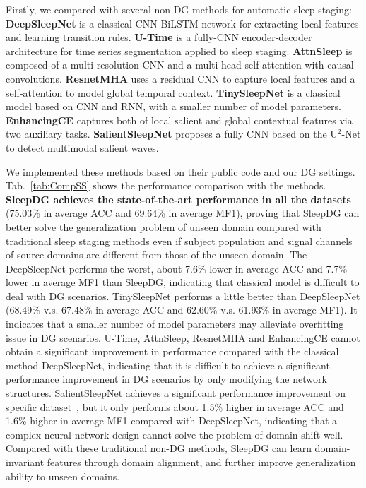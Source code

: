 \documentclass[letterpaper]{article} %
\begin{document}
	Firstly, we compared with several non-DG methods for automatic sleep staging:
	\textbf{DeepSleepNet} \citep{Supratak2017DeepSleepNetAM} is a classical CNN-BiLSTM network for extracting local features and learning transition rules.
	\textbf{U-Time} \citep{Perslev2019UTimeAF} is
	a fully-CNN encoder-decoder architecture for time series segmentation applied to sleep staging.
	\textbf{AttnSleep} \citep{Eldele2021AnAD}
	is composed of a multi-resolution CNN  and a multi-head self-attention with causal convolutions.
	\textbf{ResnetMHA} \citep{Qu2020ARB}
	uses a residual CNN to capture local features and a self-attention to model global temporal context.
	\textbf{TinySleepNet} \citep{Supratak2020TinySleepNetAE}
	is a classical model based on CNN and RNN, with a smaller number of model parameters.
	\textbf{EnhancingCE} \citep{Phyo2022EnhancingCE}
	captures both of local salient and global contextual features via two auxiliary tasks.
	\textbf{SalientSleepNet} \citep{Jia2021SalientSleepNetMS}
	proposes a fully CNN based on the U$^2$-Net to detect multimodal salient waves.
	
	We implemented these methods based on their public code and our DG settings.
	Tab.~\ref{tab:CompSS} shows the performance comparison with the methods.
	\textbf{SleepDG achieves the state-of-the-art performance in all the datasets} (75.03\% in average ACC and 69.64\% in average MF1), proving that SleepDG can better solve the generalization problem of unseen domain compared with traditional sleep staging methods even if subject population and signal channels of source domains are different from those of the unseen domain.
	The DeepSleepNet performs the worst, about 7.6\% lower in average ACC and 7.7\% lower in average MF1 than SleepDG, indicating that classical model is difficult to deal with DG scenarios.
	TinySleepNet performs a little better than DeepSleepNet (68.49\% v.s. 67.48\% in average ACC and 62.60\% v.s. 61.93\% in average MF1).
	It indicates that a smaller number of model parameters may alleviate overfitting issue in DG scenarios.
	U-Time, AttnSleep, ResnetMHA and EnhancingCE cannot obtain a significant improvement in performance compared with the classical method DeepSleepNet, indicating that it is difficult to achieve a significant performance improvement in DG scenarios by only modifying the network structures.
	SalientSleepNet achieves a significant performance improvement on specific dataset~\citep{Jia2021SalientSleepNetMS}, but it only performs about 1.5\% higher in average ACC and 1.6\% higher in average MF1 compared with DeepSleepNet, indicating that a complex neural network design cannot solve the problem of domain shift well.
	Compared with these traditional non-DG methods, SleepDG can learn domain-invariant features through domain alignment, and further improve generalization ability to unseen domains.
\end{document}
